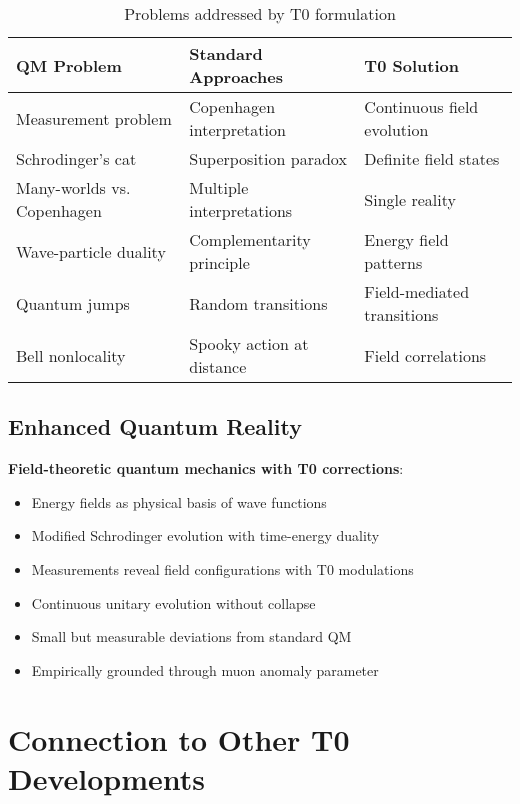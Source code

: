 \documentclass[12pt,a4paper]{article}
\begin{document}
	\begin{table}[htbp]
		\centering
		\small
		\begin{tabular}{|p{4cm}|p{5cm}|p{6cm}|}
			\hline
			\textbf{QM Problem} & \textbf{Standard Approaches} & \textbf{T0 Solution} \\
			\hline
			Measurement problem & Copenhagen interpretation & Continuous field evolution \\
			\hline
			Schrodinger's cat & Superposition paradox & Definite field states \\
			\hline
			Many-worlds vs. Copenhagen & Multiple interpretations & Single reality \\
			\hline
			Wave-particle duality & Complementarity principle & Energy field patterns \\
			\hline
			Quantum jumps & Random transitions & Field-mediated transitions \\
			\hline
			Bell nonlocality & Spooky action at distance & Field correlations \\
			\hline
		\end{tabular}
		\caption{Problems addressed by T0 formulation}
	\end{table}
	
	\subsection{Enhanced Quantum Reality}
	
	\begin{tcolorbox}[colback=green!5!white,colframe=green!75!black,title=T0-Enhanced Quantum Reality]
		\textbf{Field-theoretic quantum mechanics with T0 corrections}:
		\begin{itemize}
			\item Energy fields as physical basis of wave functions
			\item Modified Schrodinger evolution with time-energy duality
			\item Measurements reveal field configurations with T0 modulations
			\item Continuous unitary evolution without collapse
			\item Small but measurable deviations from standard QM
			\item Empirically grounded through muon anomaly parameter
		\end{itemize}
	\end{tcolorbox}
	
	\section{Connection to Other T0 Developments}
	
\end{document}

